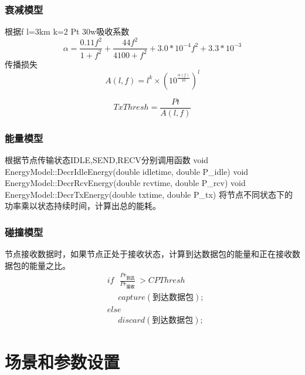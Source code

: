 \subsubsection{衰减模型}
根据f l=3km k=2 Pt 30w吸收系数
\begin{equation}
\alpha=\frac{0.11f^2}{1+f^2}+\frac{44f^2}{4100+f^2}+3.0*10^{-4}f^2+3.3*10^{-3}
\end{equation}
传播损失
\begin{equation}
A(l,f)=l^k\times(10^{\frac{\alpha (f)}{10}})^l
\end{equation}

\begin{equation}
TxThresh=\frac{Pt}{A(l,f)}
\end{equation}

\subsubsection{能量模型}
根据节点传输状态IDLE,SEND,RECV分别调用函数
void EnergyModel::DecrIdleEnergy(double idletime, double P\_idle)
void EnergyModel::DecrRcvEnergy(double rcvtime, double P\_rcv)
void EnergyModel::DecrTxEnergy(double txtime, double P\_tx)
将节点不同状态下的功率乘以状态持续时间，计算出总的能耗。

\subsubsection{碰撞模型}
节点接收数据时，如果节点正处于接收状态，计算到达数据包的能量和正在接收数据包的能量之比。
\begin{equation}
\begin{aligned}
&if \ \ \  \frac{Pr_{\mbox{到达}}}{Pr_{\mbox{接收}}}\  >CPThresh\\
&\ \ \ \ \ \ capture(\mbox{到达数据包});\\
&else\\
&\ \ \ \ \ \ discard(\mbox{到达数据包});
\end{aligned}
\end{equation}

\section {场景和参数设置}

